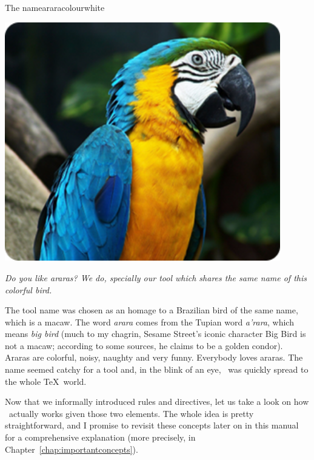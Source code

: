 \begin{messagebox}{The name}{araracolour}{\icok}{white}
\begin{minipage}{0.45\textwidth}
\vspace{.8em}
{\centering\includegraphics[width=0.9\textwidth]{figures/arara.png}\par}

\vspace{.7em}

\em Do you like araras? We do, specially our tool which shares the same name of this colorful bird.
\end{minipage}\hspace{1em}
\begin{minipage}{0.5\textwidth}
The tool name was chosen as an homage to a Brazilian bird of the same name, which is a macaw. The word \emph{arara} comes from the Tupian word \emph{a'rara}, which means \emph{big bird} (much to my chagrin, Sesame Street's iconic character Big Bird is not a macaw; according to some sources, he claims to be a golden condor). Araras are colorful, noisy, naughty and very funny. Everybody loves araras. The name seemed catchy for a tool and, in the blink of an eye, \arara\ was quickly spread to the whole \TeX\ world.
\end{minipage}
\end{messagebox}

Now that we informally introduced rules and directives, let us take a look on how \arara\ actually works given those two elements. The whole idea is pretty straightforward, and I promise to revisit these concepts later on in this manual for a comprehensive explanation (more precisely, in Chapter~\ref{chap:importantconcepts}).

